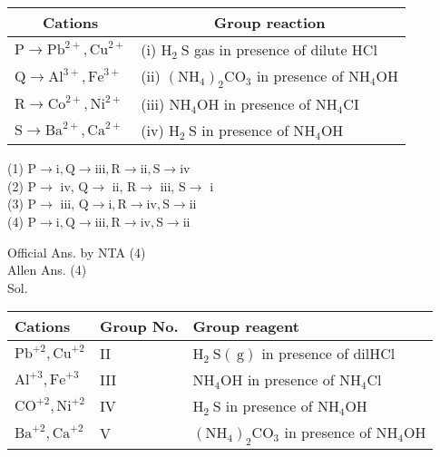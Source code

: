 \documentclass[10pt]{article}
\begin{document}
\begin{center}
\begin{tabular}{|l|l|}
\hline
\multicolumn{1}{|c|}{Cations} & \multicolumn{1}{c|}{Group reaction} \\
\hline
\(\mathrm{P} \rightarrow \mathrm{Pb}^{2+}, \mathrm{Cu}^{2+}\) & (i) \(\mathrm{H}_{2} \mathrm{~S}\) gas in presence of dilute HCl \\
\hline
\(\mathrm{Q} \rightarrow \mathrm{Al}^{3+}, \mathrm{Fe}^{3+}\) & (ii) \(\left(\mathrm{NH}_{4}\right)_{2} \mathrm{CO}_{3}\) in presence of \(\mathrm{NH}_{4} \mathrm{OH}\) \\
\hline
\(\mathrm{R} \rightarrow \mathrm{Co}^{2+}, \mathrm{Ni}^{2+}\) & (iii) \(\mathrm{NH}_{4} \mathrm{OH}\) in presence of \(\mathrm{NH}_{4} \mathrm{CI}\) \\
\hline
\(\mathrm{S} \rightarrow \mathrm{Ba}^{2+}, \mathrm{Ca}^{2+}\) & (iv) \(\mathrm{H}_{2} \mathrm{~S}\) in presence of \(\mathrm{NH}_{4} \mathrm{OH}\) \\
\hline
\end{tabular}
\end{center}

(1) \(\mathrm{P} \rightarrow \mathrm{i}, \mathrm{Q} \rightarrow \mathrm{iii}, \mathrm{R} \rightarrow \mathrm{ii}, \mathrm{S} \rightarrow \mathrm{iv}\)\\
(2) \(\mathrm{P} \rightarrow\) iv, \(\mathrm{Q} \rightarrow\) ii, \(\mathrm{R} \rightarrow\) iii, \(\mathrm{S} \rightarrow\) i\\
(3) \(\mathrm{P} \rightarrow\) iii, \(\mathrm{Q} \rightarrow \mathrm{i}, \mathrm{R} \rightarrow \mathrm{iv}, \mathrm{S} \rightarrow \mathrm{ii}\)\\
(4) \(\mathrm{P} \rightarrow \mathrm{i}, \mathrm{Q} \rightarrow \mathrm{iii}, \mathrm{R} \rightarrow \mathrm{iv}, \mathrm{S} \rightarrow \mathrm{ii}\)

Official Ans. by NTA (4)\\
Allen Ans. (4)\\
Sol.

\begin{center}
\begin{tabular}{|l|l|l|}
\hline
Cations & Group No. & Group reagent \\
\hline
\(\mathrm{Pb}^{+2}, \mathrm{Cu}^{+2}\) & II & \(\mathrm{H}_{2} \mathrm{~S}(\mathrm{~g})\) in presence of dilHCl \\
\hline
\(\mathrm{Al}^{+3}, \mathrm{Fe}^{+3}\) & III & \(\mathrm{NH}_{4} \mathrm{OH}\) in presence of \(\mathrm{NH}_{4} \mathrm{Cl}\) \\
\hline
\(\mathrm{CO}^{+2}, \mathrm{Ni}^{+2}\) & IV & \(\mathrm{H}_{2} \mathrm{~S}\) in presence of \(\mathrm{NH}_{4} \mathrm{OH}\) \\
\hline
\(\mathrm{Ba}^{+2}, \mathrm{Ca}^{+2}\) & V & \(\left(\mathrm{NH}_{4}\right)_{2} \mathrm{CO}_{3}\) in presence of \(\mathrm{NH}_{4} \mathrm{OH}\) \\
\hline
\end{tabular}
\end{center}
\end{document}
